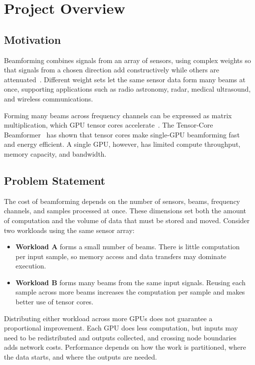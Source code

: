 \section{Project Overview}
\label{sec:project-overview}

\subsection{Motivation}
\label{sec:motivation}

Beamforming combines signals from an array of sensors, using complex weights so that signals from a chosen direction add constructively while others are attenuated~\cite{vanVeen1988beamforming}. Different weight sets let the same sensor data form many beams at once, supporting applications such as radio astronomy, radar, medical ultrasound, and wireless communications.

Forming many beams across frequency channels can be expressed as matrix multiplication, which GPU tensor cores accelerate~\cite{cudaProgrammingGuide}. The Tensor-Core Beamformer~\cite{oostrum2025tcbf} has shown that tensor cores make single-GPU beamforming fast and energy efficient. A single GPU, however, has limited compute throughput, memory capacity, and bandwidth.

\subsection{Problem Statement}
\label{sec:problem-statement}

The cost of beamforming depends on the number of sensors, beams, frequency channels, and samples processed at once. These dimensions set both the amount of computation and the volume of data that must be stored and moved. Consider two workloads using the same sensor array:

\begin{itemize}
  \item \textbf{Workload A} forms a small number of beams. There is little computation per input sample, so memory access and data transfers may dominate execution.
  \item \textbf{Workload B} forms many beams from the same input signals. Reusing each sample across more beams increases the computation per sample and makes better use of tensor cores.
\end{itemize}

Distributing either workload across more GPUs does not guarantee a proportional improvement. Each GPU does less computation, but inputs may need to be redistributed and outputs collected, and crossing node boundaries adds network costs. Performance depends on how the work is partitioned, where the data starts, and where the outputs are needed.

